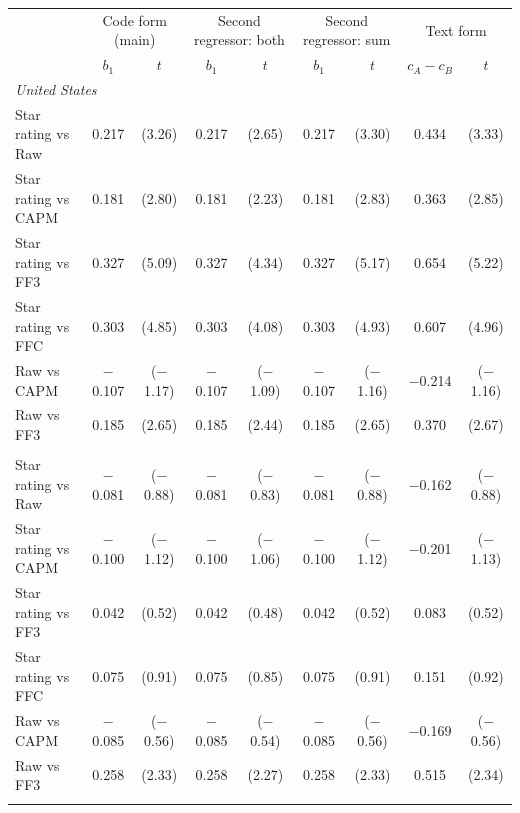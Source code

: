 \begin{tabular}{lcccccccc}
\toprule
 & \multicolumn{2}{c}{Code form (main)} & \multicolumn{2}{c}{Second regressor: both} & \multicolumn{2}{c}{Second regressor: sum} & \multicolumn{2}{c}{Text form} \\
 & $b_1$ & $t$ & $b_1$ & $t$ & $b_1$ & $t$ & $c_A-c_B$ & $t$ \\
\midrule
\multicolumn{9}{l}{\textit{United States}} \\
Star rating vs Raw & 0.217 & (3.26) & 0.217 & (2.65) & 0.217 & (3.30) & 0.434 & (3.33) \\
Star rating vs CAPM & 0.181 & (2.80) & 0.181 & (2.23) & 0.181 & (2.83) & 0.363 & (2.85) \\
Star rating vs FF3 & 0.327 & (5.09) & 0.327 & (4.34) & 0.327 & (5.17) & 0.654 & (5.22) \\
Star rating vs FFC & 0.303 & (4.85) & 0.303 & (4.08) & 0.303 & (4.93) & 0.607 & (4.96) \\
Raw vs CAPM & $-$0.107 & ($-$1.17) & $-$0.107 & ($-$1.09) & $-$0.107 & ($-$1.16) & $-$0.214 & ($-$1.16) \\
Raw vs FF3 & 0.185 & (2.65) & 0.185 & (2.44) & 0.185 & (2.65) & 0.370 & (2.67) \\
\addlinespace
\multicolumn{9}{l}{\textit{Europe}} \\
Star rating vs Raw & $-$0.081 & ($-$0.88) & $-$0.081 & ($-$0.83) & $-$0.081 & ($-$0.88) & $-$0.162 & ($-$0.88) \\
Star rating vs CAPM & $-$0.100 & ($-$1.12) & $-$0.100 & ($-$1.06) & $-$0.100 & ($-$1.12) & $-$0.201 & ($-$1.13) \\
Star rating vs FF3 & 0.042 & (0.52) & 0.042 & (0.48) & 0.042 & (0.52) & 0.083 & (0.52) \\
Star rating vs FFC & 0.075 & (0.91) & 0.075 & (0.85) & 0.075 & (0.91) & 0.151 & (0.92) \\
Raw vs CAPM & $-$0.085 & ($-$0.56) & $-$0.085 & ($-$0.54) & $-$0.085 & ($-$0.56) & $-$0.169 & ($-$0.56) \\
Raw vs FF3 & 0.258 & (2.33) & 0.258 & (2.27) & 0.258 & (2.33) & 0.515 & (2.34) \\
\addlinespace
\bottomrule
\end{tabular}
